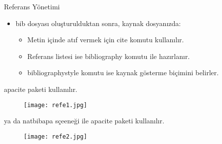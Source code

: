 \documentclass[pdf]{beamer}
\begin{document}
\begin{frame}{Referans Yönetimi}
\begin{itemize}
	\item bib dosyası oluşturulduktan sonra, kaynak dosyanızda:
	\begin{itemize}
		\item Metin içinde atıf vermek için cite komutu kullanılır.
		\item Referans listesi ise bibliography komutu ile hazırlanır.
		\item bibliographystyle komutu ise kaynak gösterme biçimini belirler.
	\end{itemize}
\end{itemize}
\end{frame}

\begin{frame}
apacite paketi kullanılır. \\
\begin{figure}
	\texttt{[image: refe1.jpg]}
\end{figure}
\end{frame}

\begin{frame}
ya da natbibapa sçeeneği ile apacite paketi kullanılır. \\
\begin{figure}
	\texttt{[image: refe2.jpg]}
\end{figure}
\end{frame}
\end{document}
